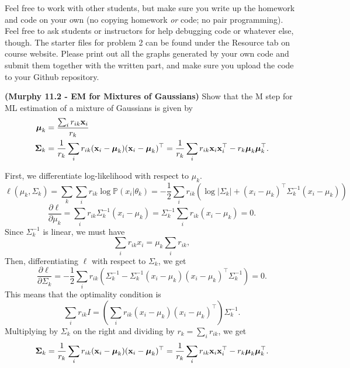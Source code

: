 \documentclass[12pt,letterpaper,fleqn]{hmcpset}
\begin{document}
Feel free to work with other students, but make sure you write up the homework
and code on your own (no copying homework \textit{or} code; no pair programming).
Feel free to ask students or instructors for help debugging code or whatever else,
though.
\newline
\newline
The starter files for problem 2 can be found under the Resource tab on course website. Please print out all the graphs generated by your own code and submit them together with the written part, and make sure you upload the code to your Github repository.\\

\begin{problem}[1]
\textbf{(Murphy 11.2 - EM for Mixtures of Gaussians)} Show that the M step for ML
estimation of a mixture of Gaussians is given by
\begin{align*}
    \hbox{\boldmath$\mu$}_k &= \frac{\sum_i r_{ik}{\bf x}_i}{r_k}\\
    \hbox{\boldmath$\Sigma$}_k &= \frac{1}{r_k}\sum_i r_{ik}({\bf x}_i - \hbox{\boldmath$\mu$}_k)({\bf x}_i - \hbox{\boldmath$\mu$}_k)^\top = \frac{1}{r_k}\sum_i r_{ik}{\bf x}_i{\bf x}_i^\top - r_k\hbox{\boldmath$\mu$}_k\hbox{\boldmath$\mu$}_k^\top.
\end{align*}
\end{problem}
\begin{solution}
First, we differentiate log-likelihood with respect to $\mu_k$.
\[
\ell(\mu_k, \Sigma_k) = \sum_{k} \sum_{i} r_{ik} \log \mathbb{P}(x_i|\theta_k) 
= -\frac{1}{2} \sum_{i} r_{ik} \left( \log |\Sigma_k| + (x_i - \mu_k)^\top \Sigma_k^{-1} (x_i - \mu_k) \right)
\]
\[
\frac{\partial \ell}{\partial \mu_k} = \sum_{i} r_{ik} \Sigma_k^{-1} (x_i - \mu_k)
= \Sigma_k^{-1} \sum_{i} r_{ik} (x_i - \mu_k) = 0.
\]
Since \(\Sigma_k^{-1}\) is linear, we must have
\[
\sum_{i} r_{ik} x_i = \mu_k \sum_{i} r_{ik},
\]
Then, differentiating $\ell$ with respect to \(\Sigma_k\), we get
\[
\frac{\partial \ell}{\partial \Sigma_k} = -\frac{1}{2} \sum_{i} r_{ik} \left( \Sigma_k^{-1} - \Sigma_k^{-1} (x_i - \mu_k)(x_i - \mu_k)^\top \Sigma_k^{-1} \right) = 0.
\]
This means that the optimality condition is
\[
\sum_{i} r_{ik} I = \left( \sum_{i} r_{ik} (x_i - \mu_k)(x_i - \mu_k)^\top \right) \Sigma_k^{-1}.
\]
Multiplying by \(\Sigma_k\) on the right and dividing by \(r_k = \sum_{i} r_{ik}\), we get 
\[
\hbox{\boldmath$\Sigma$}_k = \frac{1}{r_k}\sum_i r_{ik}({\bf x}_i - \hbox{\boldmath$\mu$}_k)({\bf x}_i - \hbox{\boldmath$\mu$}_k)^\top = \frac{1}{r_k}\sum_i r_{ik}{\bf x}_i{\bf x}_i^\top - r_k\hbox{\boldmath$\mu$}_k\hbox{\boldmath$\mu$}_k^\top.
\]


\end{solution}
\newpage
\end{document}
